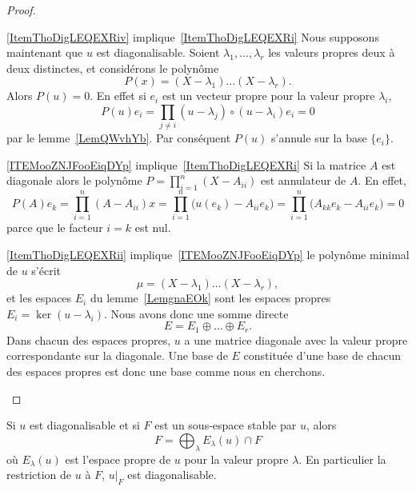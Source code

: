 \begin{proof}
\begin{subproof}
		\item[\ref{ItemThoDigLEQEXRiv} implique~\ref{ItemThoDigLEQEXRi}] Nous supposons maintenant que \( u\) est diagonalisable. Soient \( \lambda_1,\ldots, \lambda_r\) les valeurs propres deux à deux distinctes, et considérons le polynôme
		\begin{equation}
			P(x)=(X-\lambda_1)\ldots (X-\lambda_r).
		\end{equation}
		Alors \( P(u)=0\). En effet si \( e_i\) est un vecteur propre pour la valeur propre \( \lambda_i\),
		\begin{equation}
			P(u)e_i=\prod_{j\neq i}(u-\lambda_j)\circ(u-\lambda_i)e_i=0
		\end{equation}
		par le lemme~\ref{LemQWvhYb}. Par conséquent \( P(u)\) s'annule sur la base \( \{ e_i \}\).

		\item[\ref{ITEMooZNJFooEiqDYp} implique~\ref{ItemThoDigLEQEXRi}]
		Si la matrice \( A\) est diagonale alors le polynôme \( P=\prod_{i=1}^n(X-A_{ii})\) est annulateur de \( A\). En effet,
		\begin{equation}
			P(A)e_k=\prod_{i=1}^n(A-A_{ii})x=\prod_{i=1}^n\big( u(e_k)-A_{ii}e_k \big)=\prod_{i=1}^n\big( A_{kk}e_k-A_{ii}e_k \big)=0
		\end{equation}
		parce que le facteur \( i=k\) est nul.
		\item[\ref{ItemThoDigLEQEXRii} implique~\ref{ITEMooZNJFooEiqDYp}]
		le polynôme minimal de \( u\) s'écrit
		\begin{equation}
			\mu=(X-\lambda_1)\ldots(X-\lambda_r),
		\end{equation}
		et les espaces $E_i$ du lemme~\ref{LemgnaEOk} sont les espaces propres \( E_i=\ker(u-\lambda_i)\). Nous avons donc une somme directe
		\begin{equation}
			E=E_1\oplus\ldots\oplus E_r.
		\end{equation}
		Dans chacun des espaces propres, $u$ a une matrice diagonale avec la valeur propre correspondante sur la diagonale. Une base de \( E\) constituée d'une base de chacun des espaces propres est donc une base comme nous en cherchons.
	\end{subproof}
\end{proof}

\begin{corollary}       \label{CorQeVqsS}
	Si \( u\) est diagonalisable et si \( F\) est un sous-espace stable par \( u\), alors
	\begin{equation}
		F=\bigoplus_{\lambda}E_{\lambda}(u)\cap F
	\end{equation}
	où \( E_{\lambda}(u)\) est l'espace propre de \( u\) pour la valeur propre \( \lambda\). En particulier la restriction de \( u\) à \( F\), \( u|_F\) est diagonalisable.
\end{corollary}

